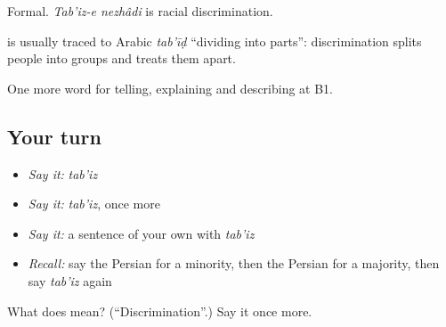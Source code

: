 Formal. \emph{Tab'iz-e nezhâdi} is racial discrimination.

\begin{cousinweb}
\textbf{} is usually traced to Arabic \emph{tab'īḍ} \textquotedblleft{}dividing into parts\textquotedblright{}: discrimination splits people into groups and treats them apart.
\end{cousinweb}

\begin{grammarlens}[title={What you've built}]
One more word for telling, explaining and describing at B1.
\end{grammarlens}

\subsection*{Your turn}
\begin{itemize}
\raggedright
  \item \emph{Say it:} \emph{tab'iz}
  \item \emph{Say it:} \emph{tab'iz}, once more
  \item \emph{Say it:} a sentence of your own with \emph{tab'iz}
  \item \emph{Recall:} say the Persian for a minority, then the Persian for a majority, then say \emph{tab'iz} again
\end{itemize}

\begin{tcolorbox}[breakable,colback=teal!4,colframe=teal!35!black,title={Before you move on}]
What does  mean? (\textquotedblleft{}Discrimination\textquotedblright{}.) Say it once more.
\end{tcolorbox}
